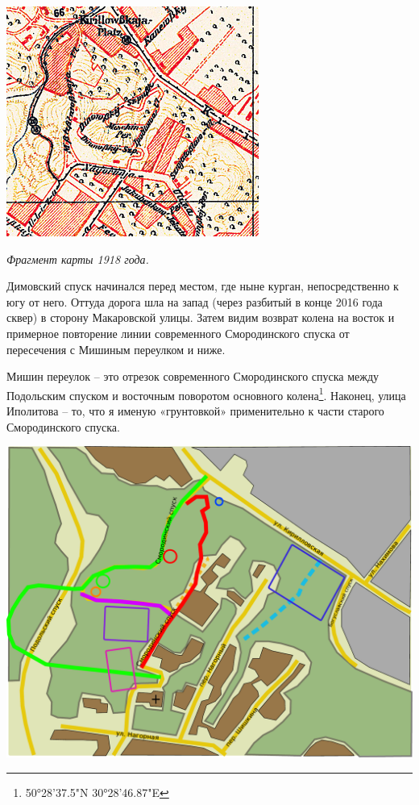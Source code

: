 \begin{center}
\includegraphics[width=\linewidth]{chast-zmiy/karta-opis/1918-smor-map.png}

\textit{Фрагмент карты 1918 года.}
\end{center}

Димовский спуск начинался перед местом, где ныне курган, непосредственно к югу от него. Оттуда дорога шла на запад (через разбитый в конце 2016 года сквер) в сторону Макаровской улицы. Затем видим возврат колена на восток и примерное повторение линии современного Смородинского спуска от пересечения с Мишиным переулком и ниже. 

Мишин переулок – это отрезок современного Смородинского спуска между Подольским спуском и восточным поворотом основного колена\footnote{50°28'37.5"N 30°28'46.87"E}. Наконец, улица Иполитова – то, что я именую «грунтовкой» применительно к части старого Смородинского спуска.

\begin{center}
\includegraphics[width=\linewidth]{chast-zmiy/karta-opis/smor-map-1918.pdf}
\end{center}

